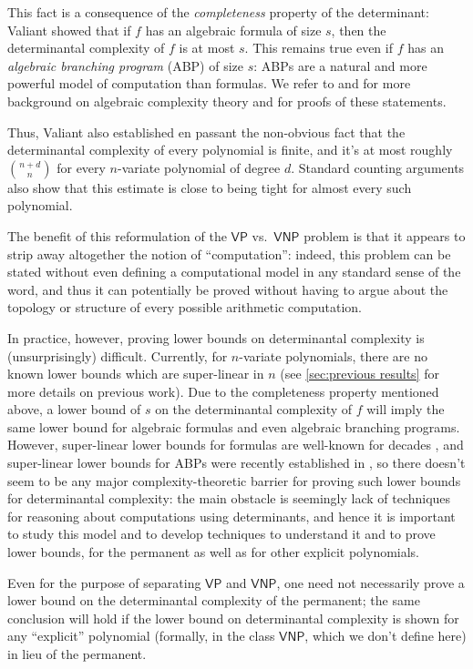\documentclass[10pt,a4paper]{article}
\newcommand{\VP}{\mathsf{VP}}
\newcommand{\VNP}{\mathsf{VNP}}
\begin{document}
This fact is a consequence of the \emph{completeness} property of the determinant: Valiant showed that if $f$ has an algebraic formula of size $s$, then the determinantal complexity of $f$ is at most $s$. This remains true even if $f$ has an \emph{algebraic branching program} (ABP) of size $s$: ABPs are a natural and more powerful model of computation than formulas. We refer to \cite{SY10} and \cite{S15} for more background on algebraic complexity theory and for proofs of these statements.

Thus, Valiant also established en passant the non-obvious fact that the determinantal complexity of every polynomial is finite, and it's at most roughly $\binom{n+d}{n}$ for every $n$-variate polynomial of degree $d$. Standard counting arguments also show that this estimate is close to being tight for almost every such polynomial.

The benefit of this reformulation of the $\VP$ vs.\ $\VNP$ problem is that it appears to strip away altogether the notion of ``computation'': indeed, this problem can be stated without even defining a computational model in any standard sense of the word, and thus it can potentially be proved without having to argue about the topology or structure of every possible arithmetic computation.

In practice, however, proving lower bounds on determinantal complexity is (unsurprisingly) difficult. Currently, for $n$-variate polynomials, there are no known lower bounds which are super-linear in $n$ (see \autoref{sec:previous results} for more details on previous work). Due to the completeness property mentioned above, a lower bound of $s$ on the determinantal complexity of $f$ will imply the same lower bound for algebraic formulas and even algebraic branching programs. However, super-linear lower bounds for formulas are well-known for decades \cite{K85}, and super-linear lower bounds for ABPs were recently established in \cite{CKSV19}, so there doesn't seem to be any major complexity-theoretic barrier for proving such lower bounds for determinantal complexity: the main obstacle is seemingly lack of techniques for reasoning about computations using determinants, and hence it is important to study this model and to develop techniques to understand it and to prove lower bounds, for the permanent as well as for other explicit polynomials.

Even for the purpose of separating $\VP$ and $\VNP$, one need not necessarily prove a lower bound on the determinantal complexity of the permanent;  the same conclusion will hold if the lower bound on determinantal complexity is shown for any ``explicit'' polynomial (formally, in the class $\VNP$, which we don't define here) in lieu of the permanent.
\end{document}
